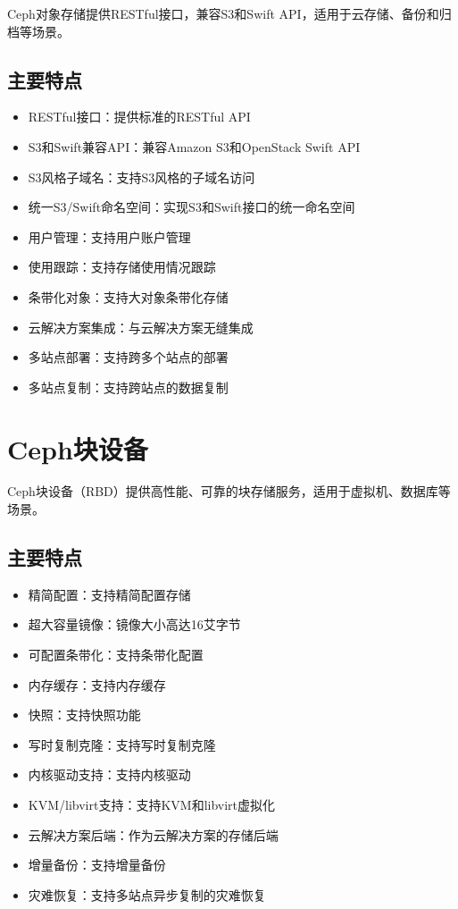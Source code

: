 \documentclass[12pt,UTF8]{ctexbook}
\begin{document}
Ceph对象存储提供RESTful接口，兼容S3和Swift API，适用于云存储、备份和归档等场景。

\subsection{主要特点}

\begin{itemize}[leftmargin=2cm]
	\item RESTful接口：提供标准的RESTful API
	\item S3和Swift兼容API：兼容Amazon S3和OpenStack Swift API
	\item S3风格子域名：支持S3风格的子域名访问
	\item 统一S3/Swift命名空间：实现S3和Swift接口的统一命名空间
	\item 用户管理：支持用户账户管理
	\item 使用跟踪：支持存储使用情况跟踪
	\item 条带化对象：支持大对象条带化存储
	\item 云解决方案集成：与云解决方案无缝集成
	\item 多站点部署：支持跨多个站点的部署
	\item 多站点复制：支持跨站点的数据复制
\end{itemize}

\section{Ceph块设备}

Ceph块设备（RBD）提供高性能、可靠的块存储服务，适用于虚拟机、数据库等场景。

\subsection{主要特点}

\begin{itemize}[leftmargin=2cm]
	\item 精简配置：支持精简配置存储
	\item 超大容量镜像：镜像大小高达16艾字节
	\item 可配置条带化：支持条带化配置
	\item 内存缓存：支持内存缓存
	\item 快照：支持快照功能
	\item 写时复制克隆：支持写时复制克隆
	\item 内核驱动支持：支持内核驱动
	\item KVM/libvirt支持：支持KVM和libvirt虚拟化
	\item 云解决方案后端：作为云解决方案的存储后端
	\item 增量备份：支持增量备份
	\item 灾难恢复：支持多站点异步复制的灾难恢复
\end{itemize}
\end{document}
